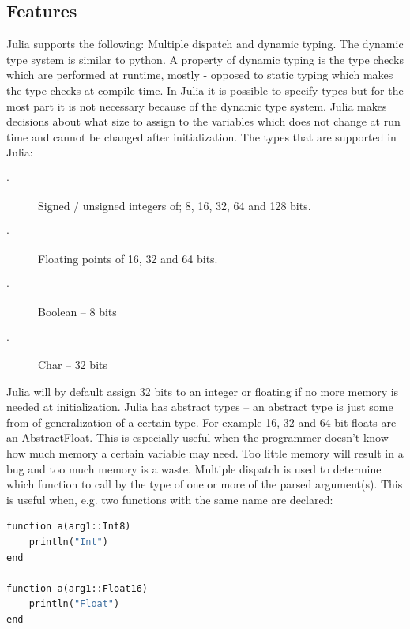 \documentclass[a4paper,11pt]{article}
\begin{document}
\subsection{Features}
Julia supports the following: Multiple dispatch and dynamic typing. The dynamic type system is similar to python. A property of dynamic typing is the type checks which are performed at runtime, mostly - opposed to static typing which makes the type checks at compile time. In Julia it is possible to specify types but for the most part it is not necessary because of the dynamic type system. Julia makes decisions about what size to assign to the variables which does not change at run time and cannot be changed after initialization. The types that are supported in Julia:
\begin{description}
	\item[$\cdot$] Signed / unsigned integers of; 8, 16, 32, 64 and 128 bits.
	\item[$\cdot$] Floating points of 16, 32 and 64 bits.  
	\item[$\cdot$] Boolean – 8 bits 
	\item[$\cdot$] Char – 32 bits 
\end{description}

Julia will by default assign 32 bits to an integer or floating if no more memory is needed at initialization. Julia has abstract types – an abstract type is just some from of generalization of a certain type. For example 16, 32 and 64 bit floats are an AbstractFloat. This is especially useful when the programmer doesn't know how much memory a certain variable may need. Too little memory will result in a bug and too much memory is a waste. Multiple dispatch is used to determine which function to call by the type of one or more of the parsed argument(s). This is useful when, e.g. two functions with the same name are declared:

\begin{lstlisting}[language=python]
function a(arg1::Int8)
	println("Int")  
end

function a(arg1::Float16)  
	println("Float")  
end    
\end{lstlisting}
\end{document}
